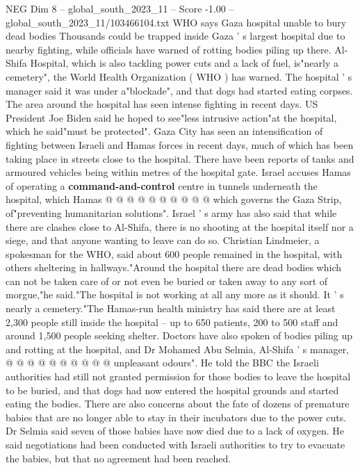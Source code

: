 \begin{textsample}{NEG Dim 8 – global\_south\_2023\_11 – Score -1.00 – global\_south\_2023\_11/103466104.txt}  \label{ex:f8_neg_186}
WHO says Gaza hospital unable to bury dead bodies Thousands could be trapped inside Gaza ' s largest hospital due to nearby fighting, while officials have warned of rotting bodies piling up there.
Al-Shifa Hospital, which is also tackling power cuts and a lack of fuel, is"nearly a cemetery", the World Health Organization ( WHO ) has warned.
The hospital ' s manager said it was under a"blockade", and that dogs had started eating corpses.
The area around the hospital has seen intense fighting in recent days.
US President Joe Biden said he hoped to see"less intrusive action"at the hospital, which he said"must be protected".
Gaza City has seen an intensification of fighting between Israeli and Hamas forces in recent days, much of which has been taking place in streets close to the hospital.
There have been reports of tanks and armoured vehicles being within metres of the hospital gate.
Israel accuses Hamas of operating a \textbf{command-and-control} centre in tunnels underneath the hospital, which Hamas @ @ @ @ @ @ @ @ @ @ which governs the Gaza Strip, of"preventing humanitarian solutions".
Israel ' s army has also said that while there are clashes close to Al-Shifa, there is no shooting at the hospital itself nor a siege, and that anyone wanting to leave can do so.
Christian Lindmeier, a spokesman for the WHO, said about 600 people remained in the hospital, with others sheltering in hallways."Around the hospital there are dead bodies which can not be taken care of or not even be buried or taken away to any sort of morgue,"he said."The hospital is not working at all any more as it should.
It ' s nearly a cemetery."The Hamas-run health ministry has said there are at least 2,300 people still inside the hospital -- up to 650 patients, 200 to 500 staff and around 1,500 people seeking shelter.
Doctors have also spoken of bodies piling up and rotting at the hospital, and Dr Mohamed Abu Selmia, Al-Shifa ' s manager, @ @ @ @ @ @ @ @ @ @ unpleasant odours".
He told the BBC the Israeli authorities had still not granted permission for those bodies to leave the hospital to be buried, and that dogs had now entered the hospital grounds and started eating the bodies.
There are also concerns about the fate of dozens of premature babies that are no longer able to stay in their incubators due to the power cuts.
Dr Selmia said seven of those babies have now died due to a lack of oxygen.
He said negotiations had been conducted with Israeli authorities to try to evacuate the babies, but that no agreement had been reached.

\end{textsample}
